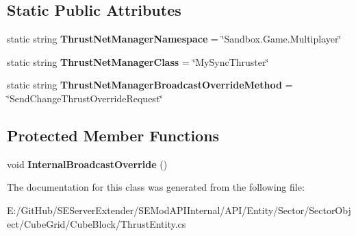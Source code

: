 \subsection*{Static Public Attributes}
\begin{DoxyCompactItemize}
\item 
\hypertarget{class_s_e_mod_a_p_i_internal_1_1_a_p_i_1_1_entity_1_1_sector_1_1_sector_object_1_1_cube_grid_1_1160ab026af0740b86534e6935a74fff2_af3d9784f0f71cf4034dd276982c2104d}{}static string {\bfseries Thrust\+Net\+Manager\+Namespace} = \char`\"{}Sandbox.\+Game.\+Multiplayer\char`\"{}\label{class_s_e_mod_a_p_i_internal_1_1_a_p_i_1_1_entity_1_1_sector_1_1_sector_object_1_1_cube_grid_1_1160ab026af0740b86534e6935a74fff2_af3d9784f0f71cf4034dd276982c2104d}

\item 
\hypertarget{class_s_e_mod_a_p_i_internal_1_1_a_p_i_1_1_entity_1_1_sector_1_1_sector_object_1_1_cube_grid_1_1160ab026af0740b86534e6935a74fff2_a9a6e81ab3084a8dbab0a730f25e3973a}{}static string {\bfseries Thrust\+Net\+Manager\+Class} = \char`\"{}My\+Sync\+Thruster\char`\"{}\label{class_s_e_mod_a_p_i_internal_1_1_a_p_i_1_1_entity_1_1_sector_1_1_sector_object_1_1_cube_grid_1_1160ab026af0740b86534e6935a74fff2_a9a6e81ab3084a8dbab0a730f25e3973a}

\item 
\hypertarget{class_s_e_mod_a_p_i_internal_1_1_a_p_i_1_1_entity_1_1_sector_1_1_sector_object_1_1_cube_grid_1_1160ab026af0740b86534e6935a74fff2_aef5d00c69c1aa1d2684d742e6baf7c68}{}static string {\bfseries Thrust\+Net\+Manager\+Broadcast\+Override\+Method} = \char`\"{}Send\+Change\+Thrust\+Override\+Request\char`\"{}\label{class_s_e_mod_a_p_i_internal_1_1_a_p_i_1_1_entity_1_1_sector_1_1_sector_object_1_1_cube_grid_1_1160ab026af0740b86534e6935a74fff2_aef5d00c69c1aa1d2684d742e6baf7c68}

\end{DoxyCompactItemize}
\subsection*{Protected Member Functions}
\begin{DoxyCompactItemize}
\item 
\hypertarget{class_s_e_mod_a_p_i_internal_1_1_a_p_i_1_1_entity_1_1_sector_1_1_sector_object_1_1_cube_grid_1_1160ab026af0740b86534e6935a74fff2_a59ad677ff8670fe801174984546426cd}{}void {\bfseries Internal\+Broadcast\+Override} ()\label{class_s_e_mod_a_p_i_internal_1_1_a_p_i_1_1_entity_1_1_sector_1_1_sector_object_1_1_cube_grid_1_1160ab026af0740b86534e6935a74fff2_a59ad677ff8670fe801174984546426cd}

\end{DoxyCompactItemize}


The documentation for this class was generated from the following file\+:\begin{DoxyCompactItemize}
\item 
E\+:/\+Git\+Hub/\+S\+E\+Server\+Extender/\+S\+E\+Mod\+A\+P\+I\+Internal/\+A\+P\+I/\+Entity/\+Sector/\+Sector\+Object/\+Cube\+Grid/\+Cube\+Block/Thrust\+Entity.\+cs\end{DoxyCompactItemize}
